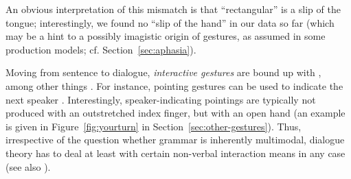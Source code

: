 \documentclass[output=paper
 	        ,biblatex
                ,babelshorthands
                ,newtxmath
                ,draftmode
                ,colorlinks, citecolor=brown
]{langscibook}
\begin{document}
\noindent An obvious interpretation of this mismatch is that \enquote{rectangular} is a slip of the tongue; interestingly, we found no \enquote{slip of the hand} in our data so far (which may be a hint to a possibly imagistic origin of gestures, as assumed in some production models; cf. Section~\ref{sec:aphasia}).


Moving from sentence to dialogue, \emph{interactive gestures} are bound up with , among other things \citep{Bavelas:Chovil:Lawrie:Wade:1992,Bavelas:Chovil:Coates:Roe:1995}.
%
For instance, pointing gestures can be used to indicate the next speaker \citep{Rieser:Poesio:2009}. 
%
Interestingly, speaker-indicating pointings are typically not produced with an outstretched index finger, but with an open hand (an example is given in Figure~\ref{fig:yourturn} in Section~\ref{sec:other-gestures}).
%
Thus, irrespective of the question whether grammar is inherently multimodal, dialogue theory has to deal at least with certain non-verbal interaction means in any case (see also ).
\end{document}
